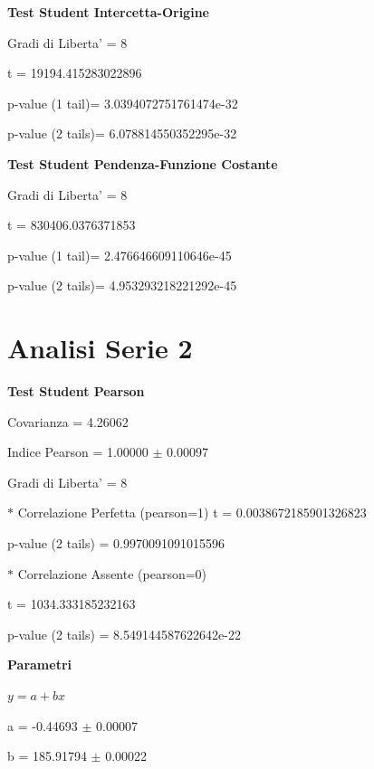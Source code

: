 \documentclass{article}
\begin{document}
\textbf{Test Student Intercetta-Origine}

Gradi di Liberta' = 8

t = 19194.415283022896

p-value (1 tail)= 3.0394072751761474e-32

p-value (2 tails)= 6.078814550352295e-32

\textbf{Test Student Pendenza-Funzione Costante}

Gradi di Liberta' = 8

t = 830406.0376371853

p-value (1 tail)= 2.476646609110646e-45

p-value (2 tails)= 4.953293218221292e-45

\section*{Analisi Serie 2}

\textbf{Test Student Pearson}

Covarianza = 4.26062

Indice Pearson = 1.00000 $\pm$ 0.00097

Gradi di Liberta' = 8

$\ast$ Correlazione Perfetta (pearson=1)
t = 0.0038672185901326823

p-value (2 tails) = 0.9970091091015596

$\ast$ Correlazione Assente (pearson=0)

t = 1034.333185232163

p-value (2 tails) = 8.549144587622642e-22

\textbf{Parametri}

$y = a + bx$

a = -0.44693 $\pm$ 0.00007

b = 185.91794 $\pm$ 0.00022
\end{document}
